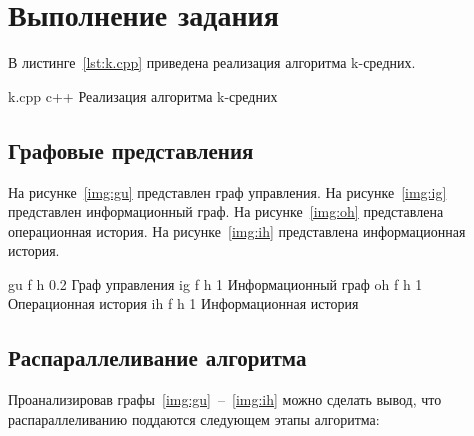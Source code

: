 \chapter{Выполнение задания}
В листинге~\ref{lst:k.cpp} приведена реализация алгоритма k-средних.


{k.cpp} %
{c++} %
{Реализация алгоритма k-средних} %

\clearpage

\section{Графовые представления}

На рисунке~\ref{img:gu} представлен граф управления.
На рисунке~\ref{img:ig} представлен информационный граф.
На рисунке~\ref{img:oh} представлена операционная история. 
На рисунке~\ref{img:ih} представлена информационная история.

\newpage
{}
{gu} %
{f} %
{h} %
{0.2\textwidth} %
{Граф управления} %
\clearpage
\newpage
{}
{ig} %
{f} %
{h} %
{1\textwidth} %
{Информационный граф} %
\clearpage
\newpage
{}
{oh} %
{f} %
{h} %
{1\textwidth} %
{Операционная история} %
\clearpage
\newpage
{}
{ih} %
{f} %
{h} %
{1\textwidth} %
{Информационная история} %
\clearpage

\newpage
\section{Распараллеливание алгоритма}

Проанализировав графы~\ref{img:gu}~--~\ref{img:ih} можно сделать вывод, что распараллеливанию поддаются следующем этапы алгоритма:

